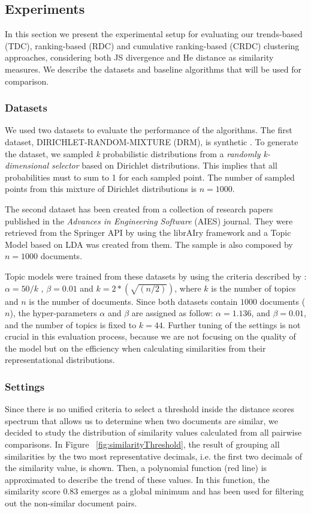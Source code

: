 \subsection{Experiments}
\label{sec:clustering-experiments}
In this section we present the experimental setup for evaluating our trends-based (TDC), ranking-based (RDC) and cumulative ranking-based (CRDC) clustering approaches, considering both JS divergence and He distance as similarity measures. We describe the datasets and baseline algorithms that will be used for comparison.

\subsubsection{Datasets}
\label{sec:clustering-datasets}
We used two datasets to evaluate the performance of the algorithms. The first dataset, DIRICHLET-RANDOM-MIXTURE (DRM), is synthetic \citep{Badenes-Olmedo2017a}. To generate the dataset, we sampled \textit{k} probabilistic distributions from a \textit{randomly k-dimensional selector} based on Dirichlet distributions. This implies that all probabilities must to sum to 1 for each sampled point. The number of sampled points from this mixture of Dirichlet distributions is $n=1000$.

The second dataset has been created from a collection of research papers published in the \textit{Advances in Engineering Software} (AIES) journal. They were retrieved from the Springer API by using the librAIry \citep{Badenes-Olmedo2017} framework and a Topic Model based on LDA was created from them. The sample is also composed by $n=1000$ documents.

Topic models were trained from these datasets by using the criteria described by \citep{Steyvers2006}: $\alpha= 50/k$ , $\beta= 0.01$ and $k=2*(\sqrt{(n/2)})$, where $k$ is the number of topics and $n$ is the number of documents. Since both datasets contain $1000$ documents ($n$), the hyper-parameters $\alpha$ and $\beta$ are assigned as follow: $\alpha=1.136$, and $\beta=0.01$, and the number of topics is fixed to $k=44$. Further tuning of the settings is not crucial in this evaluation process, because we are not focusing on the quality of the model but on the efficiency when calculating similarities from their representational distributions.

\subsubsection{Settings}
\label{sec:clustering-threshold}
Since there is no unified criteria to select a threshold inside the distance scores spectrum that allows us to determine when two documents are similar, we decided to study the distribution of similarity values calculated from all pairwise comparisons. In Figure ~\ref{fig:similarityThreshold}, the result of grouping all similarities by the two most representative decimals, i.e. the first two decimals of the similarity value, is shown. Then, a polynomial function (red line) is approximated to describe the trend of these values. In this function, the similarity score $0.83$ emerges as a global minimum and has been used for filtering out the non-similar document pairs.

